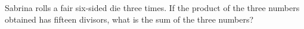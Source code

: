 Sabrina rolls a fair six-sided die three times. If the product of the three numbers obtained has fifteen divisors, what is the sum of the three numbers?
